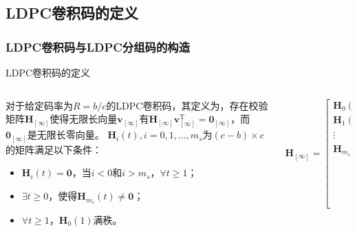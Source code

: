\documentclass{beamer}
\begin{document}
\subsection{LDPC卷积码的定义}
\begin{frame}[shrink]
	\frametitle{LDPC卷积码与LDPC分组码的构造}
		\begin{block}{LDPC卷积码的定义}
		\begin{columns}
		\begin{column}{0.4\textwidth}
		\footnotesize
对于给定码率为$R=b/c$的LDPC卷积码，其定义为，存在校验矩阵$\mathbf{H}_{[\infty]}$使得无限长向量$\mathbf{v}_{[\infty]}$有$\mathbf{H}_{[\infty]}\mathbf{v}_{[\infty]}^\text{T} =\mathbf{0}_{[\infty]}$，而$\mathbf{0}_{[\infty]}$是无限长零向量。
$\mathbf{H}_i(t),i=0,1,\dots,m_s$为$(c-b)\times c$的矩阵满足以下条件：
\begin{itemize}
\item $\mathbf{H}_i(t)=\mathbf{0}$，当$i<0$和$i>m_s$，$\forall t \geq 1$；
\item $\exists t\geq 0$，使得$\mathbf{H}_{m_s}(t) \neq \mathbf{0}$；
\item $\forall t \geq 1$，$\mathbf{H}_0(1)$满秩。
\end{itemize}
\end{column}
\begin{column}{0.6\textwidth}
\footnotesize
\begin{equation*}
    \mathbf{H}_{[\infty]} = \left[
          \begin{array}{ccccc}
            \mathbf{H}_0(1) & & & & \\
            \mathbf{H}_1(1) & \mathbf{H}_0(2) & & & \\
            \vdots & \mathbf{H}_1(2) & \ddots & & \\
            \mathbf{H}_{m_s}(1) & \vdots & \ddots & \mathbf{H}_0(t) & \\
             & \mathbf{H}_{m_s}(2) & \ddots & \mathbf{H}_1(t) & \ddots\\
             & & \ddots & \vdots & \ddots \\
             & & & \mathbf{H}_{m_s}(t) & \ddots \\
             & & & & \ddots
          \end{array} \right]
\end{equation*}
\end{column}
\end{columns}
		\end{block}
\end{frame}
\end{document}
